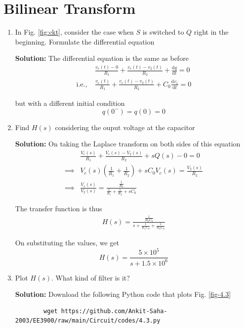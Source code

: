 \documentclass[journal,12pt,twocolumn]{IEEEtran}
\newcommand{\solution}{\noindent \textbf{Solution: }}
\providecommand{\brak}[1]{\ensuremath{\left(#1\right)}}
\providecommand{\der}[1]{\mathrm{d} #1}
\numberwithin{equation}{section}
\numberwithin{figure}{section}
\renewcommand\thesection{\arabic{section}}
\begin{document}
	\section{Bilinear Transform}
	\begin{enumerate}[label=\thesection.\arabic*.,ref=\thesection.\theenumi]
	\item In Fig. \ref{fig:ckt}, consider the case when $S$ is switched to $Q$ right in the beginning. Formulate the differential equation
	
	\solution The differential equation is the same as before 
	\begin{align}
		&\frac{v_c(t) - 0}{R_1} + \frac{v_c(t) - v_2(t)}{R_2} + \frac{\der{q}}{\der{t}} = 0 \\
		\text{i.e., } &\frac{v_c(t)}{R_1} + \frac{v_c(t) - v_2(t)}{R_2} + C_0\frac{\der{v_c}}{\der{t}} = 0
	\end{align}
	
	but with a different initial condition
	\begin{equation}
		q(0^-) = q(0) = 0
	\end{equation}
	
	\item Find $H(s)$ considering the ouput voltage at the capacitor
	
	\solution On taking the Laplace transform on both sides of this equation
	\begin{align}
		&\frac{V_c(s)}{R_1} + \frac{V_c(s) - V_2(s)}{R_2} + sQ(s) - 0 = 0 \\
		\implies &V_c(s) \brak{\frac{1}{R_1} + \frac{1}{R_2}} + sC_0V_c(s) = \frac{V_2(s)}{R_2} \\
		\implies &\frac{V_c(s)}{V_2(s)} = \frac{\frac{1}{R_2}}{\frac{1}{R_1} + \frac{1}{R_2} + sC_0}
	\end{align}
	
	The transfer function is thus
	\begin{align}
		H(s) = \frac{\frac{1}{R_2C_0}}{s + \frac{1}{R_1C_0} + \frac{1}{R_2C_0}}
	\end{align}
	
	On substituting the values, we get
	\begin{equation}
		H(s) = \frac{5 \times 10^5}{s + 1.5 \times 10^6}
	\end{equation}
	
	\item Plot $H(s)$.  What kind of filter is it?
	
	\solution Download the following Python code that plots Fig. \ref{fig-4.3}
	\begin{lstlisting}
		wget https://github.com/Ankit-Saha-2003/EE3900/raw/main/Circuit/codes/4.3.py
	\end{lstlisting}
	

\end{enumerate}
\end{document}
